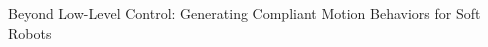 \begin{contribution}\label{contrib:motion_behaviors}
    Beyond Low-Level Control: Generating Compliant Motion Behaviors for Soft Robots
\end{contribution}


